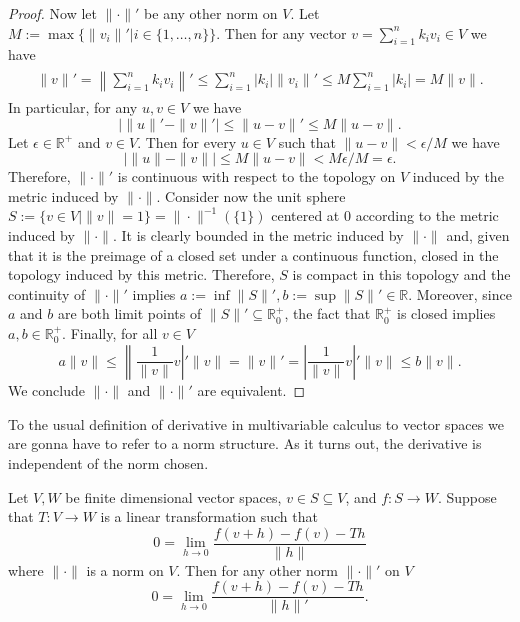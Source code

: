 \begin{proof}
	Now let $\|\cdot\|'$ be any other norm on $V$. Let $M:=\max\{\|v_i\|'|i\in\{1,\dots,n\}\}$. Then for any vector $v=\sum_{i=1}^nk_iv_i\in V$ we have
	\begin{align}
	\begin{split}
		\|v\|'=\left\lVert\sum_{i=1}^nk_iv_i\right\rVert'\leq\sum_{i=1}^n|k_i|\|v_i\|'\leq M\sum_{i=1}^n|k_i|=M\|v\|.
	\end{split}
	\end{align}
In particular, for any $u,v\in V$ we have
	\begin{equation}
		|\|u\|'-\|v\|'|\leq\|u-v\|'\leq M\|u-v\|.
	\end{equation}
Let $\epsilon\in\mathbb{R}^+$ and $v\in V$. Then for every $u\in V$ such that $\|u-v\|<\epsilon/M$ we have
	\begin{equation}
		|\|u\|-\|v\||\leq M\|u-v\|<M\epsilon/M=\epsilon.
	\end{equation} 
Therefore, $\|\cdot\|'$ is continuous with respect to the topology on $V$ induced by the metric induced by $\|\cdot\|$. Consider now the unit sphere $S:=\{v\in V|\|v\|=1\}=\|\cdot\|^{-1}(\{1\})$ centered at $0$ according to the metric induced by $\|\cdot\|$. It is clearly bounded in the metric induced by $\|\cdot\|$ and, given that it is the preimage of a closed set under a continuous function, closed in the topology induced by this metric. Therefore, $S$ is compact in this topology and the continuity of $\|\cdot\|'$ implies $a:=\inf\|S\|',b:=\sup\|S\|'\in\mathbb{R}$. Moreover, since $a$ and $b$ are both limit points of $\|S\|'\subseteq\mathbb{R}^+_0$, the fact that $\mathbb{R}^+_0$ is closed implies $a,b\in\mathbb{R}^+_0$. Finally, for all $v\in V$
\begin{equation}
a\|v\|\leq\left\lVert\frac{1}{\|v\|}v\right\rvert'\|v\|=\|v\|'=\left\lvert\frac{1}{\|v\|}v\right\rvert'\|v\|\leq b\|v\|.
\end{equation}
We conclude $\|\cdot\|$ and $\|\cdot\|'$ are equivalent.
\end{proof}

To the usual definition of derivative in multivariable calculus to vector spaces we are gonna have to refer to a norm structure. As it turns out, the derivative is independent of the norm chosen.

\begin{theorem}
Let $V,W$ be finite dimensional vector spaces, $v\in S\subseteq V$, and $f:S\rightarrow W$. Suppose that $T:V\rightarrow W$ is a linear transformation such that 
\begin{equation}
	0=\lim_{h\rightarrow 0}\frac{f(v+h)-f(v)-Th}{\|h\|}
\end{equation}
where $\|\cdot\|$ is a norm on $V$. Then for any other norm $\|\cdot\|'$ on $V$
\begin{equation}
	0=\lim_{h\rightarrow 0}\frac{f(v+h)-f(v)-Th}{\|h\|'}.
\end{equation}
\end{theorem}

